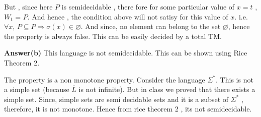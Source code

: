\documentclass[addpoints,12pt]{exam}
\begin{document}
\begin{questions}
But , since here $P$ is semidecidable , there fore for some particular value of $x=t$ , $W_{t}$ = $P$. And hence , the condition above will not satisy for this
value of $x$. i.e. \newline
$\forall x$, $P \subseteq P  \Longrightarrow \sigma (x) \in \varnothing$. \newline
And since, no element can belong to the set $\varnothing$, hence the property is always false. This can be easily decided by a total TM.


\textbf{Answer(b)}\newline
This language is not semidecidable. This can be shown using Rice Theorem 2.\newline

The property is a non monotone property.\newline
Consider the language $\Sigma^{\ast}$. This is not a simple set (because $\overline{L}$ is not infinite).
But in class we proved that there exists a simple set. Since, simple sets are semi decidable sets and it is a subset of $\Sigma^{\ast}$ , therefore,
it is not monotone. Hence from rice theorem 2 , its not semidecidable.


\end{questions}
\end{document}
